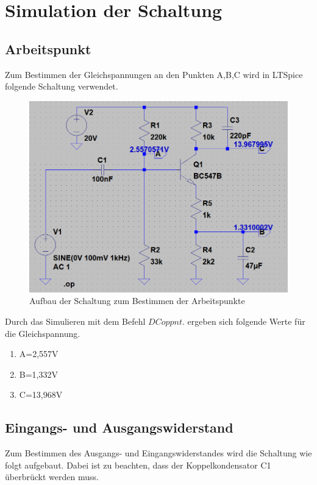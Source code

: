     \newpage
    \section{Simulation der Schaltung }
        \subsection{Arbeitspunkt}
            Zum Bestimmen der Gleichspannungen an den Punkten A,B,C wird in LTSpice folgende Schaltung verwendet.

            \begin{figure}[h!]
                \centering
                \includegraphics[width=0.7\linewidth]{321.PNG}
                \caption{Aufbau der Schaltung zum Bestimmen der Arbeitspunkte}
            \end{figure}

            Durch das Simulieren mit dem Befehl $DC op pnt.$ ergeben sich folgende Werte für die Gleichspannung.
            \begin{enumerate}
                \item A=2,557V
                \item B=1,332V
                \item C=13,968V
            \end{enumerate}

            \newpage
        \subsection{Eingangs- und Ausgangswiderstand}
            Zum Bestimmen des Ausgangs- und Eingangswiderstandes wird die Schaltung wie folgt aufgebaut. Dabei ist zu beachten, dass der Koppelkondensator C1 überbrückt werden muss.

